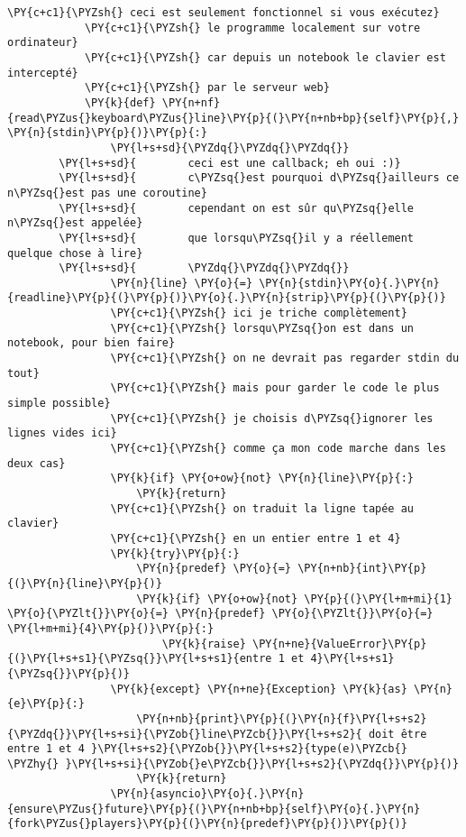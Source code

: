 \begin{Verbatim}[commandchars=\\\{\},frame=single,framerule=0.3mm,rulecolor=\color{cellframecolor}]
            \PY{c+c1}{\PYZsh{} ceci est seulement fonctionnel si vous exécutez}
            \PY{c+c1}{\PYZsh{} le programme localement sur votre ordinateur}
            \PY{c+c1}{\PYZsh{} car depuis un notebook le clavier est intercepté}
            \PY{c+c1}{\PYZsh{} par le serveur web}
            \PY{k}{def} \PY{n+nf}{read\PYZus{}keyboard\PYZus{}line}\PY{p}{(}\PY{n+nb+bp}{self}\PY{p}{,} \PY{n}{stdin}\PY{p}{)}\PY{p}{:}
                \PY{l+s+sd}{\PYZdq{}\PYZdq{}\PYZdq{}}
        \PY{l+s+sd}{        ceci est une callback; eh oui :)}
        \PY{l+s+sd}{        c\PYZsq{}est pourquoi d\PYZsq{}ailleurs ce n\PYZsq{}est pas une coroutine}
        \PY{l+s+sd}{        cependant on est sûr qu\PYZsq{}elle n\PYZsq{}est appelée}
        \PY{l+s+sd}{        que lorsqu\PYZsq{}il y a réellement quelque chose à lire}
        \PY{l+s+sd}{        \PYZdq{}\PYZdq{}\PYZdq{}}
                \PY{n}{line} \PY{o}{=} \PY{n}{stdin}\PY{o}{.}\PY{n}{readline}\PY{p}{(}\PY{p}{)}\PY{o}{.}\PY{n}{strip}\PY{p}{(}\PY{p}{)}
                \PY{c+c1}{\PYZsh{} ici je triche complètement}
                \PY{c+c1}{\PYZsh{} lorsqu\PYZsq{}on est dans un notebook, pour bien faire}
                \PY{c+c1}{\PYZsh{} on ne devrait pas regarder stdin du tout}
                \PY{c+c1}{\PYZsh{} mais pour garder le code le plus simple possible}
                \PY{c+c1}{\PYZsh{} je choisis d\PYZsq{}ignorer les lignes vides ici}
                \PY{c+c1}{\PYZsh{} comme ça mon code marche dans les deux cas}
                \PY{k}{if} \PY{o+ow}{not} \PY{n}{line}\PY{p}{:}
                    \PY{k}{return}
                \PY{c+c1}{\PYZsh{} on traduit la ligne tapée au clavier}
                \PY{c+c1}{\PYZsh{} en un entier entre 1 et 4}
                \PY{k}{try}\PY{p}{:}
                    \PY{n}{predef} \PY{o}{=} \PY{n+nb}{int}\PY{p}{(}\PY{n}{line}\PY{p}{)}
                    \PY{k}{if} \PY{o+ow}{not} \PY{p}{(}\PY{l+m+mi}{1} \PY{o}{\PYZlt{}}\PY{o}{=} \PY{n}{predef} \PY{o}{\PYZlt{}}\PY{o}{=} \PY{l+m+mi}{4}\PY{p}{)}\PY{p}{:}
                        \PY{k}{raise} \PY{n+ne}{ValueError}\PY{p}{(}\PY{l+s+s1}{\PYZsq{}}\PY{l+s+s1}{entre 1 et 4}\PY{l+s+s1}{\PYZsq{}}\PY{p}{)}
                \PY{k}{except} \PY{n+ne}{Exception} \PY{k}{as} \PY{n}{e}\PY{p}{:}
                    \PY{n+nb}{print}\PY{p}{(}\PY{n}{f}\PY{l+s+s2}{\PYZdq{}}\PY{l+s+si}{\PYZob{}line\PYZcb{}}\PY{l+s+s2}{ doit être entre 1 et 4 }\PY{l+s+s2}{\PYZob{}}\PY{l+s+s2}{type(e)\PYZcb{} \PYZhy{} }\PY{l+s+si}{\PYZob{}e\PYZcb{}}\PY{l+s+s2}{\PYZdq{}}\PY{p}{)}
                    \PY{k}{return}
                \PY{n}{asyncio}\PY{o}{.}\PY{n}{ensure\PYZus{}future}\PY{p}{(}\PY{n+nb+bp}{self}\PY{o}{.}\PY{n}{fork\PYZus{}players}\PY{p}{(}\PY{n}{predef}\PY{p}{)}\PY{p}{)}
\end{Verbatim}


